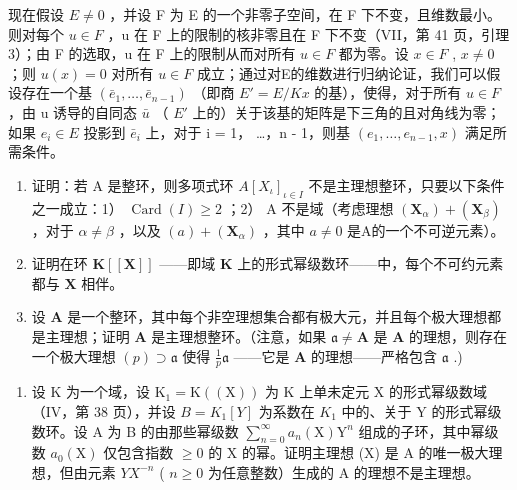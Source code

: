 现在假设 \(E \neq 0\) ，并设 F 为 E 的一个非零子空间，在 F 下不变，且维数最小。则对每个 \(u \in F\) ，u 在 F 上的限制的核非零且在 F 下不变（VII，第 41 页，引理 3）；由 F 的选取，u 在 F 上的限制从而对所有 \(u \in F\) 都为零。设 \(x \in F\) , \(x \neq 0\) ；则 \(u(x) = 0\) 对所有 \(u \in F\) 成立；通过对E的维数进行归纳论证，我们可以假设存在一个基 \((\bar{e}_{1}, \ldots, \bar{e}_{n-1})\) （即商 \(E' = E/Kx\) 的基），使得，对于所有 \(u \in F\) ，由 u 诱导的自同态 \(\bar{u}\) （ \(E'\) 上的）关于该基的矩阵是下三角的且对角线为零；如果 \(e_{i} \in E\) 投影到 \(\bar{e}_{i}\) 上，对于 i = 1， \ldots，n - 1，则基 \((e_{1}, \ldots, e_{n-1}, x)\) 满足所需条件。

\BourbakiExercises

\BourbakiExerciseGroup

\begin{enumerate}
\def\labelenumi{\arabic{enumi})}
\item
  证明：若 A 是整环，则多项式环 \(A[X_{\iota}]_{\iota \in I}\) 不是主理想整环，只要以下条件之一成立：1） \(\operatorname{Card}(I) \geqslant 2\) ；2） A 不是域（考虑理想 \((\mathbf{X}_{\alpha}) + (\mathbf{X}_{\beta})\) ，对于 \(\alpha \neq \beta\) ，以及 \((a) + (\mathbf{X}_{\alpha})\) ，其中 \(a \neq 0\) 是A的一个不可逆元素）。
\item
  证明在环 \(\mathbf{K}[[\mathbf{X}]]\) ——即域 \(\mathbf{K}\) 上的形式幂级数环——中，每个不可约元素都与 \(\mathbf{X}\) 相伴。
\item
  设 \(\mathbf{A}\) 是一个整环，其中每个非空理想集合都有极大元，并且每个极大理想都是主理想；证明 \(\mathbf{A}\) 是主理想整环。（注意，如果 \(\mathfrak{a} \neq \mathbf{A}\) 是 \(\mathbf{A}\) 的理想，则存在一个极大理想 \((p) \supset \mathfrak{a}\) 使得 \(\frac{1}{p} \mathfrak{a}\) ——它是 \(\mathbf{A}\) 的理想——严格包含 \(\mathfrak{a}\) .)
\end{enumerate}

\begin{enumerate}
\def\labelenumi{\alph{enumi})}
\setcounter{enumi}{1}
\tightlist
\item
  设 K 为一个域，设 \(\mathrm{K}_{1}=\mathrm{K}((\mathrm{X}))\) 为 K 上单未定元 X 的形式幂级数域（IV，第 38 页），并设 \(B=K_{1}[Y]\) 为系数在 \(K_{1}\) 中的、关于 Y 的形式幂级数环。设 A 为 B 的由那些幂级数 \(\sum_{n=0}^{\infty}a_{n}(\mathrm{X})\mathrm{Y}^{n}\) 组成的子环，其中幂级数 \(a_{0}(\mathrm{X})\) 仅包含指数 \(\geqslant 0\) 的 X 的幂。证明主理想 (X) 是 A 的唯一极大理想，但由元素 \(YX^{-n}\) ( \(n \geqslant 0\) 为任意整数）生成的 A 的理想不是主理想。
\end{enumerate}

